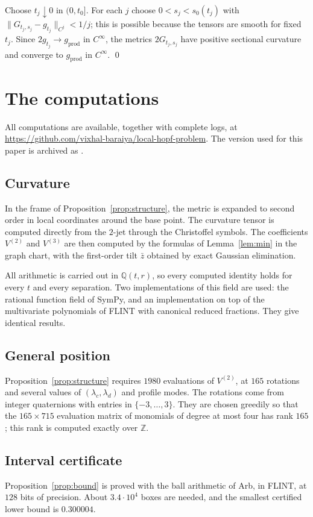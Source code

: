 \documentclass[11pt]{amsart}
\theoremstyle{definition}
\theoremstyle{remark}
\newcommand{\Q}{\mathbb{Q}}
\newcommand{\gprod}{g_{\mathrm{prod}}}
\newcommand{\codeurl}{\url{https://github.com/vixhal-baraiya/local-hopf-problem}}
\begin{document}
Choose $t_j\downarrow0$ in $(0,t_0]$. For each $j$ choose $0<s_j<s_0(t_j)$ with $\|G_{t_j,s_j}-g_{t_j}\|_{C^j}<1/j$; this is possible because the tensors are smooth for fixed $t_j$. Since $2g_{t_j}\to\gprod$ in $C^\infty$, the metrics $2G_{t_j,s_j}$ have positive sectional curvature and converge to $\gprod$ in $C^\infty$. \qed

\section{The computations}\label{sec:computer}

All computations are available, together with complete logs, at\\ \codeurl. The version used for this paper is archived as \cite{code}.

\subsection*{Curvature}
In the frame of Proposition~\ref{prop:structure}, the metric is expanded to second order in local coordinates around the base point. The curvature tensor is computed directly from the $2$-jet through the Christoffel symbols. The coefficients $V^{(2)}$ and $V^{(3)}$ are then computed by the formulas of Lemma~\ref{lem:min} in the graph chart, with the first-order tilt $\bar z$ obtained by exact Gaussian elimination.

All arithmetic is carried out in $\Q(t,r)$, so every computed identity holds for every $t$ and every separation. Two implementations of this field are used: the rational function field of SymPy, and an implementation on top of the multivariate polynomials of FLINT with canonical reduced fractions. They give identical results.

\subsection*{General position}
Proposition~\ref{prop:structure} requires $1980$ evaluations of $V^{(2)}$, at $165$ rotations and several values of $(\lambda_c,\lambda_d)$ and profile modes. The rotations come from integer quaternions with entries in $\{-3,\dots,3\}$. They are chosen greedily so that the $165\times715$ evaluation matrix of monomials of degree at most four has rank $165$; this rank is computed exactly over $\mathbb Z$.

\subsection*{Interval certificate}
Proposition~\ref{prop:bound} is proved with the ball arithmetic of Arb, in FLINT, at $128$ bits of precision. About $3.4\cdot10^4$ boxes are needed, and the smallest certified lower bound is $0.300004$.
\end{document}
